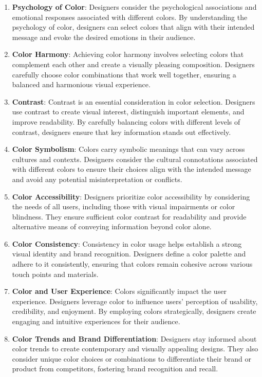 \begin{enumerate}
\item \textbf{Psychology of Color}: Designers consider the psychological associations and emotional responses associated with different colors. By understanding the psychology of color, designers can select colors that align with their intended message and evoke the desired emotions in their audience.

\item \textbf{Color Harmony}: Achieving color harmony involves selecting colors that complement each other and create a visually pleasing composition. Designers carefully choose color combinations that work well together, ensuring a balanced and harmonious visual experience.

\item \textbf{Contrast}: Contrast is an essential consideration in color selection. Designers use contrast to create visual interest, distinguish important elements, and improve readability. By carefully balancing colors with different levels of contrast, designers ensure that key information stands out effectively.

\item \textbf{Color Symbolism}: Colors carry symbolic meanings that can vary across cultures and contexts. Designers consider the cultural connotations associated with different colors to ensure their choices align with the intended message and avoid any potential misinterpretation or conflicts.

\item \textbf{Color Accessibility}: Designers prioritize color accessibility by considering the needs of all users, including those with visual impairments or color blindness. They ensure sufficient color contrast for readability and provide alternative means of conveying information beyond color alone.

\item \textbf{Color Consistency}: Consistency in color usage helps establish a strong visual identity and brand recognition. Designers define a color palette and adhere to it consistently, ensuring that colors remain cohesive across various touch points and materials.

\item \textbf{Color and User Experience}: Colors significantly impact the user experience. Designers leverage color to influence users' perception of usability, credibility, and enjoyment. By employing colors strategically, designers create engaging and intuitive experiences for their audience.

\item \textbf{Color Trends and Brand Differentiation}: Designers stay informed about color trends to create contemporary and visually appealing designs. They also consider unique color choices or combinations to differentiate their brand or product from competitors, fostering brand recognition and recall.
\end{enumerate}

